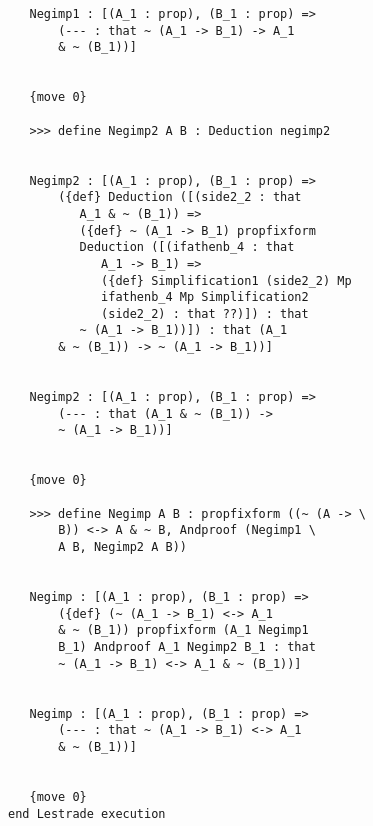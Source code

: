 \documentclass[12pt]{article}
\begin{document}
\begin{verbatim}
   Negimp1 : [(A_1 : prop), (B_1 : prop) => 
       (--- : that ~ (A_1 -> B_1) -> A_1 
       & ~ (B_1))]


   {move 0}

   >>> define Negimp2 A B : Deduction negimp2


   Negimp2 : [(A_1 : prop), (B_1 : prop) => 
       ({def} Deduction ([(side2_2 : that 
          A_1 & ~ (B_1)) => 
          ({def} ~ (A_1 -> B_1) propfixform 
          Deduction ([(ifathenb_4 : that 
             A_1 -> B_1) => 
             ({def} Simplification1 (side2_2) Mp 
             ifathenb_4 Mp Simplification2 
             (side2_2) : that ??)]) : that 
          ~ (A_1 -> B_1))]) : that (A_1 
       & ~ (B_1)) -> ~ (A_1 -> B_1))]


   Negimp2 : [(A_1 : prop), (B_1 : prop) => 
       (--- : that (A_1 & ~ (B_1)) -> 
       ~ (A_1 -> B_1))]


   {move 0}

   >>> define Negimp A B : propfixform ((~ (A -> \
       B)) <-> A & ~ B, Andproof (Negimp1 \
       A B, Negimp2 A B))


   Negimp : [(A_1 : prop), (B_1 : prop) => 
       ({def} (~ (A_1 -> B_1) <-> A_1 
       & ~ (B_1)) propfixform (A_1 Negimp1 
       B_1) Andproof A_1 Negimp2 B_1 : that 
       ~ (A_1 -> B_1) <-> A_1 & ~ (B_1))]


   Negimp : [(A_1 : prop), (B_1 : prop) => 
       (--- : that ~ (A_1 -> B_1) <-> A_1 
       & ~ (B_1))]


   {move 0}
end Lestrade execution
\end{verbatim}
\end{document}
